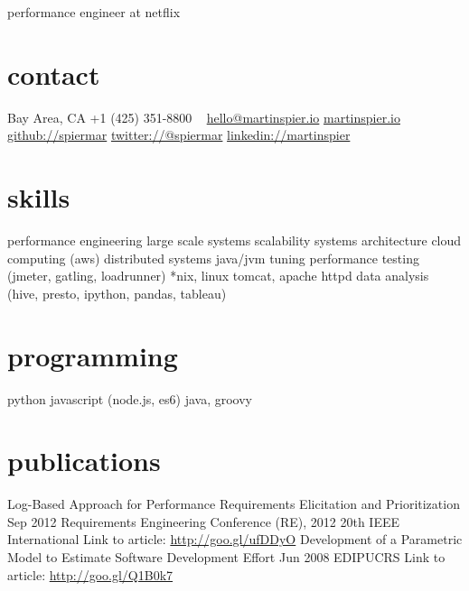 \documentclass[11pt, print]{friggeri-cv}
\begin{document}
       {performance engineer at netflix}

\begin{aside}
  \section{contact}
    Bay Area, CA
    +1 (425) 351-8800
    ~
    \href{mailto:hello@martinspier.io}{hello@martinspier.io}
    \href{http://martinspier.io}{martinspier.io}
    \href{https://github.com/spiermar}{github://spiermar}
    \href{https://twitter.com/spiermar}{twitter://@spiermar}
    \href{https://www.linkedin.com/in/martinspier}{linkedin://martinspier}
  \section{skills}
    performance engineering
    large scale systems
    scalability
    systems architecture
    cloud computing
    (aws)
    distributed systems
    java/jvm tuning
    performance testing
    (jmeter, gatling, loadrunner)
    *nix, linux
    tomcat, apache httpd
    data analysis
    (hive, presto, ipython, pandas, tableau)
    \section{programming}
      python
      javascript
      (node.js, es6)
      java, groovy
\end{aside}




\section{publications}


\begin{entrylist}
  \simpleentry
    {Log-Based Approach for Performance Requirements Elicitation and Prioritization}
    {Sep 2012}
    {Requirements Engineering Conference (RE), 2012 20th IEEE International}
    {Link to article: \url{http://goo.gl/ufDDyO}}
  \simpleentry
    {Development of a Parametric Model to Estimate Software Development Effort}
    {Jun 2008}
    {EDIPUCRS}
    {Link to article: \url{http://goo.gl/Q1B0k7}}
\end{entrylist}
\end{document}

